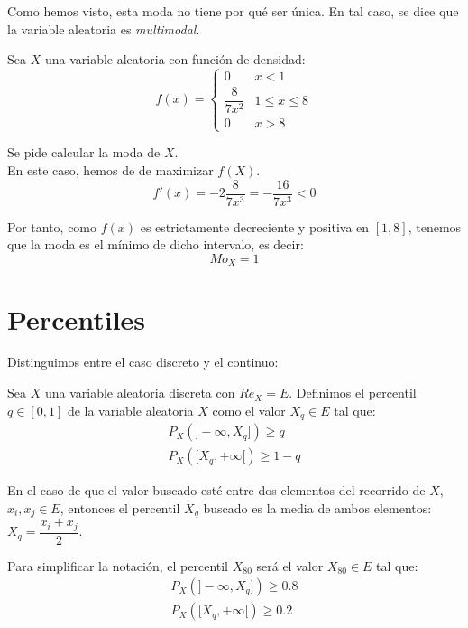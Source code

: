 Como hemos visto, esta moda no tiene por qué ser única. En tal caso, se dice que la variable aleatoria es \emph{multimodal}.

\begin{ejemplo}
    Sea $X$ una variable aleatoria con función de densidad:
    $$f(x) = \left\{ \begin{array}{ll}
        0               & x < 1           \\
        \dfrac{8}{7x^2} & 1 \leq x \leq 8 \\
        0               & x > 8
      \end{array} \right.$$
    
    Se pide calcular la moda de $X$.\\
    
    En este caso, hemos de de maximizar $f(X)$.
    \begin{equation*}
        f'(x)= -2\frac{8}{7x^3} = -\frac{16}{7x^3}< 0
    \end{equation*}

    Por tanto, como $f(x)$ es estrictamente decreciente y positiva en $[1,8]$, tenemos que la moda es el mínimo de dicho intervalo, es decir:
    $$Mo_X=1$$
\end{ejemplo}

\section{Percentiles}

Distinguimos entre el caso discreto y el continuo:
\begin{definicion}
    Sea $X$ una variable aleatoria discreta con $Re_X=E$. Definimos el percentil $q\in [0, 1]$ de la variable aleatoria $X$ como el valor $X_q \in E$ tal que:
    $$\begin{array}{c}
        P_X(]-\infty, X_q]) \geq q \\
        P_X([X_q, +\infty[) \geq 1-q
    \end{array}$$

    En el caso de que el valor buscado esté entre dos elementos del recorrido de $X$, $x_i, x_j \in E$, entonces el percentil $X_q$ buscado es la media de ambos elementos: $X_q = \dfrac{x_i+x_j}{2}$.
\end{definicion}

\begin{notacion}
    Para simplificar la notación, el percentil $X_{80}$ será el valor $X_{80} \in E$ tal que:
    $$\begin{array}{c}
        P_X(]-\infty, X_q]) \geq 0.8 \\
        P_X([X_q, +\infty[) \geq 0.2
    \end{array}$$
\end{notacion}

